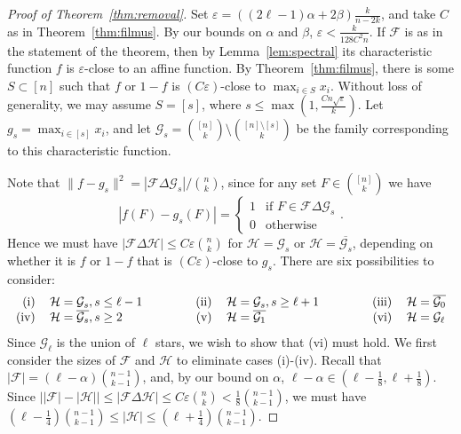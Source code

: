 \documentclass[11pt]{article}
\theoremstyle{definition}
\newcommand{\eps}{\varepsilon}
\newcommand{\cH}{\mathcal{H}}
\newcommand{\cF}{\mathcal{F}}
\newcommand{\cG}{\mathcal{G}}
\newcommand{\3}{\bf{3}}
\renewcommand{\l}{\ensuremath{\ell}}
\newcommand{\card}[1]{\left| #1 \right|}
\begin{document}
\begin{proof}[Proof of Theorem~\ref{thm:removal}]
Set $\eps = ((2\l - 1)\alpha + 2 \beta)\frac{k}{n-2k}$, and take $C$ as in Theorem~\ref{thm:filmus}.  By our bounds on $\alpha$ and $\beta$, $\eps < \frac{k}{128C^2 n}$.  If $\cF$ is as in the statement of the theorem, then by Lemma~\ref{lem:spectral} its characteristic function $f$ is $\eps$-close to an affine function.  By Theorem~\ref{thm:filmus}, there is some $S \subset [n]$ such that $f$ or $1-f$ is $(C\eps)$-close to $\max_{i \in S} x_i$.  Without loss of generality, we may assume $S = [s]$, where $s \le \max \left(1 , \frac{Cn \sqrt{\eps}}{k} \right)$.  Let $g_s = \max_{i \in [s]} x_i$, and let $\cG_s = \binom{[n]}{k} \setminus \binom{[n] \setminus [s]}{k}$ be the family corresponding to this characteristic function.

Note that $\| f - g_s \|^2 = \card{\cF \Delta \cG_s} / \binom{n}{k}$, since for any set $F \in \binom{[n]}{k}$ we have
\[ \card{ f(F) - g_s(F) } = \left\{ \begin{array}{ll}
	1 & \textrm{if } F \in \cF \Delta \cG_s \\
	0 & \textrm{otherwise}
	\end{array} \right. . \]
Hence we must have $\card{\cF \Delta \cH} \le C \eps \binom{n}{k}$ for $\cH = \cG_s$ or $\cH = \overline{\cG_s}$, depending on whether it is $f$ or $1-f$ that is $(C \eps)$-close to $g_s$.  There are six possibilities to consider:
\begin{equation*}
\begin{tabular}{rlrlrl}
	(i)&$\cH = \cG_s, s \le \l - 1$ \hspace{1.0cm} &(ii)&$\cH = \cG_s, s \ge \l + 1$ \hspace{1.0cm} &(iii)&$\cH = \overline{\cG_0}$ \\
	(iv)&$\cH = \overline{\cG_s}, s \ge 2$ &(v)&$\cH = \overline{\cG_1}$ &(vi)&$\cH = \cG_{\l}$
\end{tabular}
\end{equation*}
Since $\cG_{\l}$ is the union of $\l$ stars, we wish to show that (vi) must hold.  We first consider the sizes of $\cF$ and $\cH$ to eliminate cases (i)-(iv).  Recall that $\card{\cF} = (\l - \alpha) \binom{n-1}{k-1}$, and, by our bound on $\alpha$, $\l - \alpha \in ( \l - \frac18, \l + \frac18)$.  Since $\card{ \card{\cF} - \card{\cH} } \le \card{ \cF \Delta \cH} \le C \eps \binom{n}{k} < \frac18 \binom{n-1}{k-1}$, we must have $\left( \l - \frac14 \right) \binom{n-1}{k-1} \le \card{\cH} \le \left( \l + \frac14 \right) \binom{n-1}{k-1}$.


\end{proof}
\end{document}
